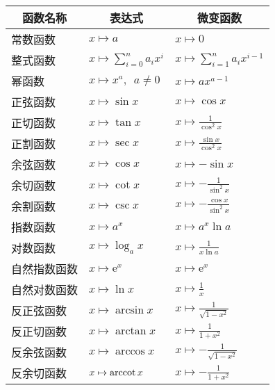 \documentclass[12pt,UTF8]{ctexbook}
\begin{document}
\begin{appendix}
\begin{center}
    \renewcommand{\arraystretch}{2}
    \setlength{\extrarowheight}{-3pt}
    \begin{longtable}{|l|l|l|}
        \hline \multicolumn{1}{|c|}{\textbf{函数名称}} & \multicolumn{1}{c|}{\textbf{表达式}} & \multicolumn{1}{c|}{\textbf{微变函数}} \\ 
        \hline         
        常数函数 & $x\mapsto a$ & $x\mapsto 0$ \\  
        \hline
        整式函数 & $x\mapsto \sum_{i=0}^n a_i x^i$ & $x\mapsto \sum_{i=1}^n a_i x^{i-1}$ \\ 
        \hline
        幂函数 & $x\mapsto x^a, \,\,\, a\neq 0$ & $x\mapsto ax^{a-1}$ \\ 
        \hline
        正弦函数 & $x\mapsto \sin{x}$ & $x\mapsto \cos{x}$ \\ 
        \hline
        正切函数 & $x\mapsto \tan{x}$ & $x\mapsto \frac{1}{\cos^2{x}}$ \\
        \hline
        正割函数 & $x\mapsto \sec{x}$ & $x\mapsto \frac{\sin{x}}{\cos^2{x}}$ \\ 
        \hline
        余弦函数 & $x\mapsto \cos{x}$ & $x\mapsto -\sin{x}$ \\ 
        \hline
        余切函数 & $x\mapsto \cot{x}$ & $x\mapsto -\frac{1}{\sin^2{x}}$ \\ 
        \hline
        余割函数 & $x\mapsto \csc{x}$ & $x\mapsto -\frac{\cos{x}}{\sin^2{x}}$ \\
        \hline
        指数函数 & $x\mapsto a^x$ & $x\mapsto a^x \ln{a} $ \\ 
        \hline
        对数函数 & $x\mapsto \log_a{x}$ & $x\mapsto \frac{1}{x\ln{a}} $ \\
        \hline
        自然指数函数 & $x\mapsto \mathrm{e}^x$ & $x\mapsto \mathrm{e}^x $ \\ 
        \hline
        自然对数函数 & $x\mapsto \ln{x}$ & $x\mapsto \frac{1}{x} $ \\  
        \hline
        反正弦函数 & $x\mapsto \arcsin{x}$ & $x\mapsto \frac{1}{\sqrt{1 - x^2}}$ \\ 
        \hline
        反正切函数 & $x\mapsto \arctan{x}$ & $x\mapsto \frac{1}{1 + x^2}$ \\
        \hline
        反余弦函数 & $x\mapsto \arccos{x}$ & $x\mapsto -\frac{1}{\sqrt{1 - x^2}}$ \\ 
        \hline
        反余切函数 & $x\mapsto \operatorname{arccot}{x}$ & $x\mapsto -\frac{1}{1 + x^2}$ \\ 
        \hline
    \end{longtable}
\end{center}


\end{appendix}
\end{document}
